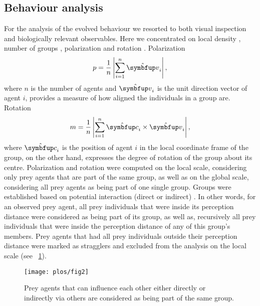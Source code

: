\subsection{Behaviour analysis}

For the analysis of the evolved behaviour we resorted to both visual inspection \cite{kunz2006prey} and biologically relevant observables. Here we concentrated on local density \cite{huepe2008newtools}, number of groups \cite{lebarbajec2007boids,viscido2015using}, polarization and rotation \cite{couzin2002collective,tunstrom2013collective,vicsek2012collective}. Polarization
%
\begin{equation}
p=\frac{1}{n}\left|\sum_{i=1}^{n}\uvec{v}_i\right|,
\end{equation}
%
where $n$ is the number of agents and $\uvec{v}_i$ is the unit direction vector of agent $i$, provides a measure of how aligned the individuals in a group are. Rotation
%
\begin{equation}
m=\frac{1}{n}\left|\sum_{i=1}^{n}\uvec{c}_{i} \times \uvec{v}_i\right|,
\end{equation}
%
where $\uvec{c}_i$ is the position of agent $i$ in the local coordinate frame of the group, on the other hand, expresses the degree of rotation of the group about its centre. Polarization and rotation were computed on the local scale, \ie considering only prey agents that are part of the same group, as well as on the global scale, \ie considering all prey agents as being part of one single group. Groups were established based on potential interaction (direct or indirect) \cite{lebarbajec2007boids,viscido2015using}. In other words, for an observed prey agent, all prey individuals that were inside its perception distance were considered as being part of its group, as well as, recursively all prey individuals that were inside the perception distance of any of this group's members. Prey agents that had all prey individuals outside their perception distance were marked as stragglers and excluded from the analysis on the local scale (see \figurename~\ref{fig2}).

\begin{figure}
  \texttt{[image: plos/fig2]}
  \caption{Prey agents that can influence each other either directly or indirectly via others are considered as being part of the same group.}
  \label{fig2}
\end{figure}

